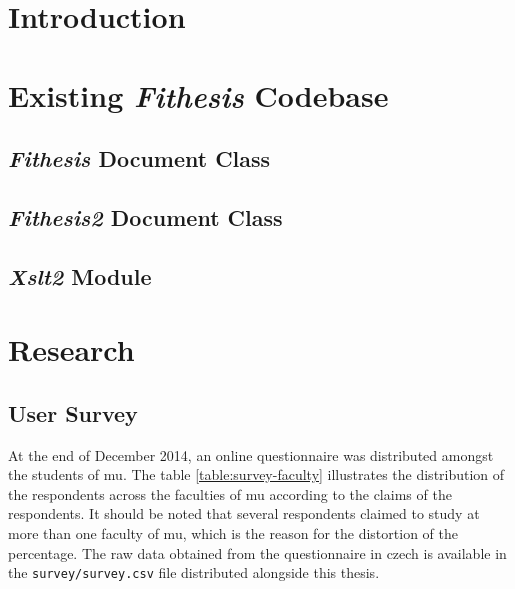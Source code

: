   \begin{ThesisAbstract}
    \blindtext
  \end{ThesisAbstract}

  \begin{ThesisKeyWords}
    \blindtext
  \end{ThesisKeyWords}

  \tableofcontents
  \listoftables
  \listoffigures

  \MainMatter
  \chapter{Introduction}
    \blindtext

  \chapter{Existing \emph{Fithesis} Codebase}
    \blindtext
    
    \section{\emph{Fithesis} Document Class}
    \blindtext

    \section{\emph{Fithesis2} Document Class}
    \blindtext

    \section{\emph{Xslt2} Module}
    \blindtext

  \chapter{Research}
  \blindtext

    \section{User Survey}
    At the end of December 2014, an online questionnaire was distributed amongst the students of \gls{mu}. The table \ref{table:survey-faculty} illustrates the distribution of the respondents across the faculties of \gls{mu} according to the claims of the respondents. It should be noted that several respondents claimed to study at more than one faculty of \gls{mu}, which is the reason for the distortion of the percentage. The raw data obtained from the questionnaire in czech is available in the \texttt{survey/survey.csv} file distributed alongside this thesis.

